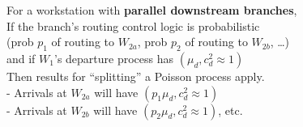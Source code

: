 \documentclass[11pt]{article}
\begin{document}
\vspace{3mm}

\noindent For a workstation with \textbf{parallel downstream branches},\\
\noindent If the branch's routing control logic is probabilistic\\
\noindent (prob $p_1$ of routing to $W_{2a}$, prob $p_2$ of routing to $W_{2b}$, \ldots)\\
\noindent and if $W_1$'s departure process has $(\mu_d, c_d^2 \approx 1)$\\
\noindent Then results for ``splitting'' a Poisson process apply.\\
\noindent - Arrivals at $W_{2a}$ will have $(p_1 \mu_d, c_d^2 \approx 1)$\\
\noindent - Arrivals at $W_{2b}$ will have $(p_2 \mu_d, c_d^2 \approx 1)$, etc.
\end{document}

